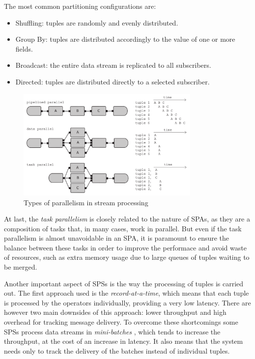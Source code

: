\documentclass[ppgc,diss,english]{iiufrgs}
\begin{document}
The most common partitioning configurations are:

\begin{itemize}
\item Shuffling: tuples are randomly and evenly distributed.
\item Group By: tuples are distributed accordingly to the value of one or more fields.
\item Broadcast: the entire data stream is replicated to all subscribers.
\item Directed: tuples are distributed directly to a selected subscriber.
\end{itemize}

\begin{figure}[!ht]
	\centering
	\includegraphics[width=0.8\textwidth]{images/sps_parallelism.png}
	\caption[Types of parallelism in stream processing]{Types of parallelism in stream processing \cite{andrade2014fundamentals}}
	\label{fig:sps_parallelism}
\end{figure}

At last, the \emph{task parallelism} is closely related to the nature of SPAs, as they are a composition of tasks that, in many cases, work in parallel. But even if the task parallelism is almost unavoidable in an SPA, it is paramount to ensure the balance between these tasks in order to improve the performace and avoid waste of resources, such as extra memory usage due to large queues of tuples waiting to be merged.


Another important aspect of SPSs is the way the processing of tuples is carried out. The first approach used is the \emph{record-at-a-time}, which means that each tuple is processed by the operators individually, providing a very low latency. There are however two main downsides of this approach: lower throughput and high overhead for tracking message delivery. To overcome these shortcomings some SPSs process data streams in \emph{mini-batches} \cite{muralidharan2014fault}, which tends to increase the throughput, at the cost of an increase in latency. It also means that the system needs only to track the delivery of the batches instead of individual tuples.
\end{document}
